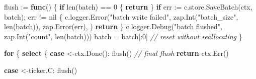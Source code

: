 \documentclass[
]{article}
\newenvironment{Shaded}{}{}
\newcommand{\BuiltInTok}[1]{\textcolor[rgb]{0.00,0.50,0.00}{#1}}
\newcommand{\CommentTok}[1]{\textcolor[rgb]{0.38,0.63,0.69}{\textit{#1}}}
\newcommand{\ControlFlowTok}[1]{\textcolor[rgb]{0.00,0.44,0.13}{\textbf{#1}}}
\newcommand{\DecValTok}[1]{\textcolor[rgb]{0.25,0.63,0.44}{#1}}
\newcommand{\KeywordTok}[1]{\textcolor[rgb]{0.00,0.44,0.13}{\textbf{#1}}}
\newcommand{\NormalTok}[1]{#1}
\newcommand{\OperatorTok}[1]{\textcolor[rgb]{0.40,0.40,0.40}{#1}}
\newcommand{\OtherTok}[1]{\textcolor[rgb]{0.00,0.44,0.13}{#1}}
\newcommand{\StringTok}[1]{\textcolor[rgb]{0.25,0.44,0.63}{#1}}
\begin{document}
\begin{Shaded}
\begin{Highlighting}[]
\NormalTok{    flush }\OperatorTok{:=} \KeywordTok{func}\OperatorTok{()} \OperatorTok{\{}
        \ControlFlowTok{if} \BuiltInTok{len}\OperatorTok{(}\NormalTok{batch}\OperatorTok{)} \OperatorTok{==} \DecValTok{0} \OperatorTok{\{}
            \ControlFlowTok{return}
        \OperatorTok{\}}
        \ControlFlowTok{if}\NormalTok{ err }\OperatorTok{:=}\NormalTok{ c}\OperatorTok{.}\NormalTok{store}\OperatorTok{.}\NormalTok{SaveBatch}\OperatorTok{(}\NormalTok{ctx}\OperatorTok{,}\NormalTok{ batch}\OperatorTok{);}\NormalTok{ err }\OperatorTok{!=} \OtherTok{nil} \OperatorTok{\{}
\NormalTok{            c}\OperatorTok{.}\NormalTok{logger}\OperatorTok{.}\NormalTok{Error}\OperatorTok{(}\StringTok{"batch write failed"}\OperatorTok{,}
\NormalTok{                zap}\OperatorTok{.}\NormalTok{Int}\OperatorTok{(}\StringTok{"batch\_size"}\OperatorTok{,} \BuiltInTok{len}\OperatorTok{(}\NormalTok{batch}\OperatorTok{)),}
\NormalTok{                zap}\OperatorTok{.}\NormalTok{Error}\OperatorTok{(}\NormalTok{err}\OperatorTok{),}
            \OperatorTok{)}
            \ControlFlowTok{return}
        \OperatorTok{\}}
\NormalTok{        c}\OperatorTok{.}\NormalTok{logger}\OperatorTok{.}\NormalTok{Debug}\OperatorTok{(}\StringTok{"batch flushed"}\OperatorTok{,}\NormalTok{ zap}\OperatorTok{.}\NormalTok{Int}\OperatorTok{(}\StringTok{"count"}\OperatorTok{,} \BuiltInTok{len}\OperatorTok{(}\NormalTok{batch}\OperatorTok{)))}
\NormalTok{        batch }\OperatorTok{=}\NormalTok{ batch}\OperatorTok{[:}\DecValTok{0}\OperatorTok{]} \CommentTok{// reset without reallocating}
    \OperatorTok{\}}

    \ControlFlowTok{for} \OperatorTok{\{}
        \ControlFlowTok{select} \OperatorTok{\{}
        \ControlFlowTok{case} \OperatorTok{\textless{}{-}}\NormalTok{ctx}\OperatorTok{.}\NormalTok{Done}\OperatorTok{():}
\NormalTok{            flush}\OperatorTok{()} \CommentTok{// final flush}
            \ControlFlowTok{return}\NormalTok{ ctx}\OperatorTok{.}\NormalTok{Err}\OperatorTok{()}

        \ControlFlowTok{case} \OperatorTok{\textless{}{-}}\NormalTok{ticker}\OperatorTok{.}\NormalTok{C}\OperatorTok{:}
\NormalTok{            flush}\OperatorTok{()}


\end{Highlighting}
\end{Shaded}
\end{document}
